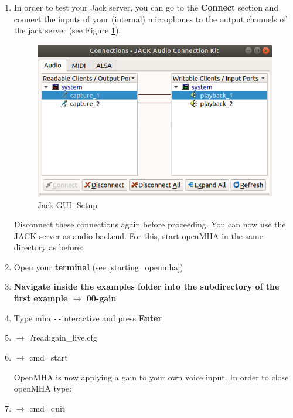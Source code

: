 \documentclass[11pt,a4paper,twoside]{article}
\newcommand{\+}{\discretionary{\mbox{\scriptsize$\hookleftarrow$}}{}{}}
\begin{document}
{{\begin{enumerate}
\item In order to test your Jack server, you can go to the \textbf{Connect} section and connect the inputs of your (internal) microphones to the output channels of the jack server (see Figure \ref{fig: jack_connection}).

\begin{figure}[H]
\centering
\includegraphics[scale=0.4]{jack_connection.png}
\caption{Jack GUI: Setup}
\label{fig: jack_connection}
\end{figure}


Disconnect these connections again before proceeding.
You can now use the JACK server as audio backend. For this, start openMHA in the same directory as before:

\item Open your \textbf{terminal} (see \ref{starting_openmha})
    \item \textbf{Navigate inside the examples folder into the subdirectory of the first example $\rightarrow$ \textbf{00-gain}} \\ 
    \item Type {{\ttfamily mha \texttt{-{}-}interactive}} and press \textbf{Enter}
 
\item $\rightarrow$ {\ttfamily ?read:gain\_live.cfg}
    \item $\rightarrow$ {\ttfamily cmd=start}

OpenMHA is now applying a gain to your own voice input. In order to close openMHA type:
\item  $\rightarrow$ {\ttfamily cmd=quit}


\end{enumerate}}}
\end{document}
